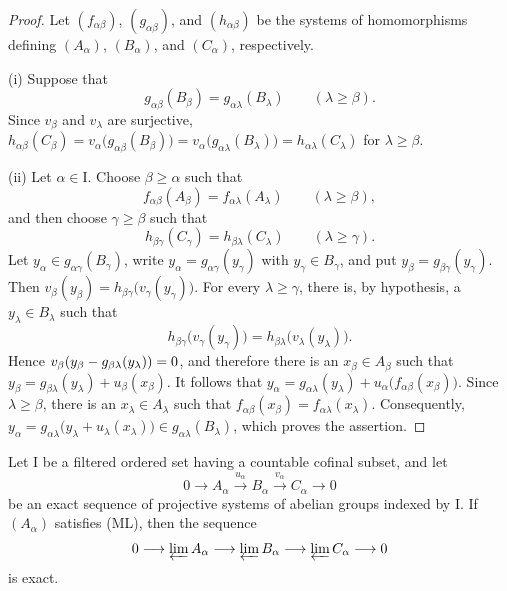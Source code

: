 \begin{proof}
Let $(f_{\alpha\beta})$, $(g_{\alpha\beta})$, and
$(h_{\alpha\beta})$ be the systems of homomorphisms defining
$(A_\alpha)$, $(B_\alpha)$, and $(C_\alpha)$, respectively.

(i) Suppose that
\[
  g_{\alpha\beta}(B_\beta)
  =
  g_{\alpha\lambda}(B_\lambda)
  \qquad(\lambda\geq\beta).
\]
Since $v_\beta$ and $v_\lambda$ are surjective, $h_{\alpha\beta}(C_\beta)
=
v_\alpha\bigl(g_{\alpha\beta}(B_\beta)\bigr)
=
v_\alpha\bigl(g_{\alpha\lambda}(B_\lambda)\bigr)
=
h_{\alpha\lambda}(C_\lambda)$
for $\lambda\geq\beta$.

(ii) Let $\alpha\in\mathrm{I}$.
Choose $\beta\geq\alpha$ such that
\[
  f_{\alpha\beta}(A_\beta)
  =
  f_{\alpha\lambda}(A_\lambda)
  \qquad(\lambda\geq\beta),
\]
and then choose $\gamma\geq\beta$ such that
\[
  h_{\beta\gamma}(C_\gamma)
  =
  h_{\beta\lambda}(C_\lambda)
  \qquad(\lambda\geq\gamma).
\]
Let $y_\alpha\in g_{\alpha\gamma}(B_\gamma)$, write
$y_\alpha=g_{\alpha\gamma}(y_\gamma)$ with $y_\gamma\in B_\gamma$,
and put $y_\beta=g_{\beta\gamma}(y_\gamma)$.
Then $v_\beta(y_\beta)
=
h_{\beta\gamma}\bigl(v_\gamma(y_\gamma)\bigr)$.
For every $\lambda\geq\gamma$, there is, by hypothesis, a
$y_\lambda\in B_\lambda$ such that
\[
  h_{\beta\gamma}\bigl(v_\gamma(y_\gamma)\bigr)
  =
  h_{\beta\lambda}\bigl(v_\lambda(y_\lambda)\bigr).
\]
Hence
$v_\beta(y_\beta- g_{\beta\lambda}(y_\lambda))=0$, and therefore
there is an $x_\beta\in A_\beta$
such that $y_\beta
=
g_{\beta\lambda}(y_\lambda)+u_\beta(x_\beta)$.
It follows that $y_\alpha
=
g_{\alpha\lambda}(y_\lambda)
+
u_\alpha\bigl(f_{\alpha\beta}(x_\beta)\bigr)$.
Since $\lambda\geq\beta$, there is an $x_\lambda\in A_\lambda$ such
that $f_{\alpha\beta}(x_\beta)=f_{\alpha\lambda}(x_\lambda)$.
Consequently, $y_\alpha
=
g_{\alpha\lambda}
\bigl(y_\lambda+u_\lambda(x_\lambda)\bigr)
\in g_{\alpha\lambda}(B_\lambda)$,
which proves the assertion.
\end{proof}

\begin{proposition}[13.2.2]
\label{0.13.2.2}
Let $\mathrm{I}$ be a filtered ordered set having a countable
cofinal subset, and let
\[
  0\longrightarrow A_\alpha
  \xrightarrow{u_\alpha}B_\alpha
  \xrightarrow{v_\alpha}C_\alpha
  \longrightarrow0
\]
be an exact sequence of projective systems of abelian groups indexed
by $\mathrm{I}$.
If $(A_\alpha)$ satisfies {\rm(ML)}, then the sequence
\[
  0\longrightarrow\varprojlim A_\alpha
  \longrightarrow\varprojlim B_\alpha
  \longrightarrow\varprojlim C_\alpha
  \longrightarrow0
\]
is exact.
\end{proposition}


